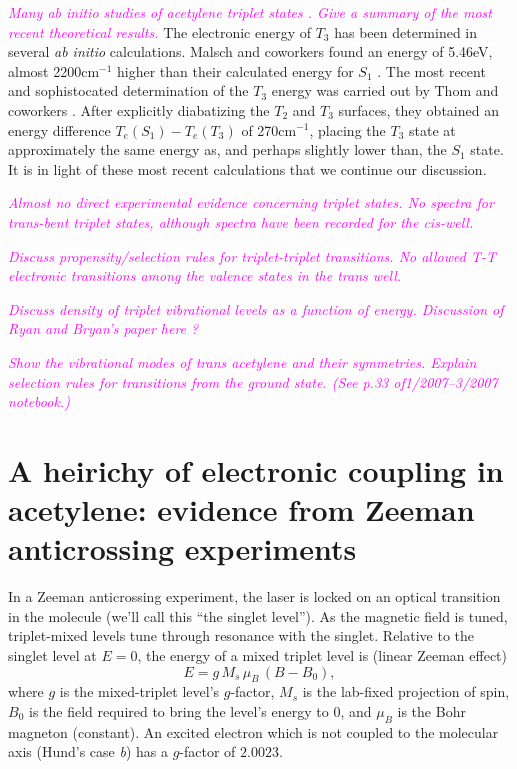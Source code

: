 \documentclass[12pt]{mitthesis}
\newcommand{\POINT}[1]{\textcolor{magenta}{\emph{#1}}}
\begin{document}
\POINT{Many ab initio studies of acetylene triplet states
  \cite{demoulin75, lischka86, cui96, cui97, malsch98, dallos02,
    ventura03, thom07}.  Give a summary of the most recent theoretical
  results.}  The electronic energy of $T_3$ has been determined in
several \emph{ab initio} calculations.  Malsch and coworkers found an
energy of 5.46eV, almost 2200cm$^{-1}$ higher than their calculated
energy for $S_1$ \cite{malsch98}.  The most recent and sophistocated
determination of the $T_3$ energy was carried out by Thom and
coworkers \cite{thom07}.  After explicitly diabatizing the $T_2$ and
$T_3$ surfaces, they obtained an energy difference $T_e(S_1)-T_e(T_3)$
of 270cm$^{-1}$, placing the $T_3$ state at approximately the same
energy as, and perhaps slightly lower than, the $S_1$ state.  It is in
light of these most recent calculations that we continue our
discussion.

\POINT{Almost no direct experimental evidence concerning triplet
  states.  No spectra for trans-bent triplet states, although spectra
  have been recorded for the cis-well.}

\POINT{Discuss propensity/selection rules for triplet-triplet
  transitions.  No allowed T-T electronic transitions among the
  valence states in the trans well.}

\POINT{Discuss density of triplet vibrational levels as a function of
  energy.  Discussion of Ryan and Bryan's paper here \cite{thom07}?}

\POINT{Show the vibrational modes of \emph{trans} acetylene and their
  symmetries.  Explain selection rules for transitions from the ground
  state.  (See p.33 of1/2007--3/2007 notebook.)}


\section{A heirichy of electronic coupling in acetylene: evidence from
  Zeeman anticrossing experiments}

In a Zeeman anticrossing experiment, the laser is locked on an optical
transition in the molecule (we'll call this ``the singlet level'').
As the magnetic field is tuned, triplet-mixed levels tune through
resonance with the singlet.  Relative to the singlet level at
$E=0$, the energy of a mixed triplet level is (linear Zeeman effect)
\begin{equation}
E = g \, M_s \, \mu_B \, (B-B_0),
\end{equation}
where $g$ is the mixed-triplet level's $g$-factor, $M_s$ is the
lab-fixed projection of spin, $B_0$ is the field required to bring the
level's energy to 0, and $\mu_B$ is the Bohr magneton (constant).  An
excited electron which is not coupled to the molecular axis (Hund's
case \emph{b}) has a $g$-factor of $2.0023$.
\end{document}
